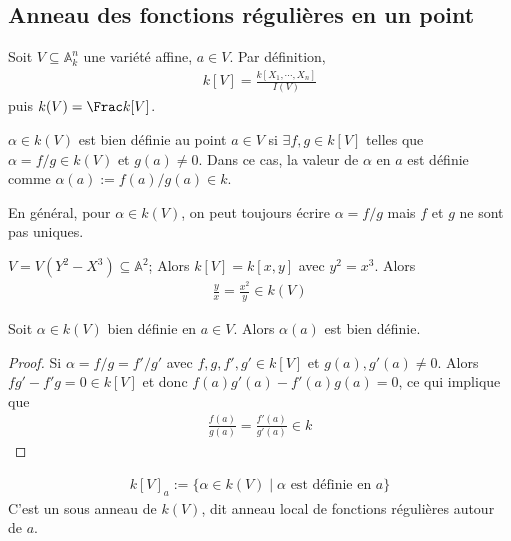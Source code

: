         \subsection{Anneau des fonctions régulières en un point}
            Soit $V \subseteq \mathbb{A}^n_k$ une variété affine, $a \in V$. Par définition,
            \begin{align*}
                k[V] = \frac{k[X_1, \cdots, X_n]}{I(V)}
            \end{align*}
            puis $k(V) = \Frac k[V]$.
            \begin{defi}
                $\alpha \in k(V)$ est bien définie au point $a \in V$ si $\exists f,g \in k[V]$ telles que $\alpha = f/g \in k(V)$ et $g(a) \neq 0$. Dans ce cas, la valeur de $\alpha$ en $a$ est définie comme $\alpha(a) := f(a)/g(a) \in k$.
            \end{defi}
            \begin{remq}
                En général, pour $\alpha \in k(V)$, on peut toujours écrire $\alpha = f/g$ mais $f$ et $g$ ne sont pas uniques.
            \end{remq}
            \begin{expl}
                $V = V(Y^2 - X^3) \subseteq \mathbb{A}^2$; Alors $k[V] = k[x,y]$ avec $y^2 = x^3$. Alors 
                \begin{align*}
                    \frac yx = \frac{x^2}y \in k(V)
                \end{align*}
            \end{expl}
            \begin{prop}
                Soit $\alpha \in k(V)$ bien définie en $a \in V$. Alors $\alpha(a)$ est bien définie.
            \end{prop}
            \begin{proof}
                Si $\alpha = f/g = f'/g'$ avec $f,g,f',g' \in k[V]$ et $g(a), g'(a) \neq 0$. Alors $fg' - f'g = 0 \in k[V]$ et donc $f(a)g'(a) - f'(a)g(a) = 0$, ce qui implique que
                \begin{align*}
                    \frac{f(a)}{g(a)} = \frac{f'(a)}{g'(a)} \in k
                \end{align*}
            \end{proof}
            \begin{nota}
                \begin{align*}
                    k[V]_a := \{\alpha \in k(V) \mid \alpha \text{ est définie en } a \}
                \end{align*}
                C'est un sous anneau de $k(V)$, dit anneau local de fonctions régulières autour de $a$.
            \end{nota}
